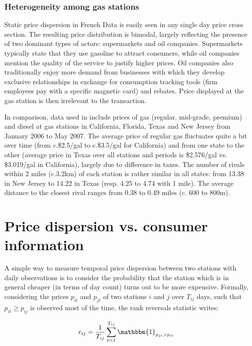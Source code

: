 \documentclass[11pt]{article}
\begin{document}
\subsubsection{Heterogeneity among gas stations}

Static price dispersion in French Data is easily seen in any single day price cross section. The resulting price distribution is bimodal, largely reflecting the presence of two dominant types of actors: supermarkets and oil companies. Supermarkets typically state that they use gasoline to attract consumers, while oil companies mention the quality of the service to justify higher prices. Oil companies also traditionally enjoy more demand from businesses with which they develop exclusive relationships in exchange for consumption tracking tools (firm employees pay with a specific magnetic card) and rebates. Price displayed at the gas station is then irrelevant to the transaction.

In comparison, data used in \cite{TAP11} include prices of gas (regular, mid-grade, premium) and diesel at gas stations in California, Florida, Texas and New Jersey from January 2006 to May 2007. The average price of regular gas fluctuates quite a bit over time (from c.\$2.5/gal to c.\$3.5/gal for California) and from one state to the other (average price in Texas over all stations and periods is \$2.576/gal vs. \$3.019/gal in California), largely due to difference in taxes. The number of rivals within 2 miles (c.3.2km) of each station is rather similar in all states: from 13.38 in New Jersey to 14.22 in Texas (resp. 4.25 to 4.74 with 1 mile). The average distance to the closest rival ranges from 0.38 to 0.49 miles (c. 600 to 800m).

\section{Price dispersion vs. consumer information}

A simple way to measure temporal price dispersion between two stations with daily observations is to consider the probability that the station which is in general cheaper (in terms of day count) turns out to be more expensive. Formally, considering the prices $p_{it}$ and $p_{jt}$ of two stations $i$ and $j$ over $T_{ij}$ days, such that $p_{it} \ge p_{ij}$ is observed most of the time, the rank reversals statistic writes:

\begin{align*}
r_{ij} = \frac{1}{T_{ij}} \sum_{t=1}^{T_{ij}} \mathbbm{1}_{p_{jt} > p_{it}}
\end{align*}
\end{document}
